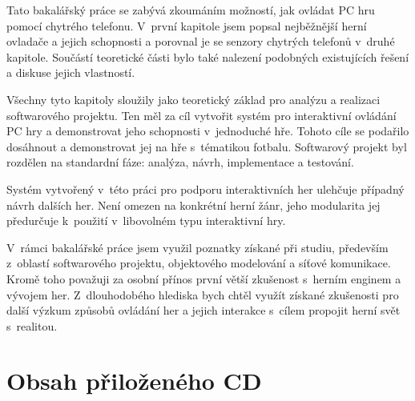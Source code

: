 \documentclass[thesis=B,czech,hidelinks]{FITthesis}[2012/06/26] %
\begin{document}
\begin{conclusion}
	
Tato bakalářský práce se zabývá zkoumáním možností, jak ovládat PC hru pomocí chytrého telefonu. V~první kapitole jsem popsal nejběžnější herní ovladače a jejich schopnosti a porovnal je se senzory chytrých telefonů v~druhé kapitole. Součástí teoretické části bylo také nalezení podobných existujících řešení a diskuse jejich vlastností.

Všechny tyto kapitoly sloužily jako teoretický základ pro analýzu a realizaci softwarového projektu. Ten měl za cíl vytvořit systém pro interaktivní ovládání PC hry a demonstrovat jeho schopnosti v~jednoduché hře. Tohoto cíle se podařilo dosáhnout a demonstrovat jej na hře s~tématikou fotbalu. Softwarový projekt byl rozdělen na standardní fáze: analýza, návrh, implementace a testování.

Systém vytvořený v~této práci pro podporu interaktivních her ulehčuje případný návrh dalších her. Není omezen na konkrétní herní žánr, jeho modularita jej předurčuje k~použití v~libovolném typu interaktivní hry. 

V~rámci bakalářské práce jsem využil poznatky získané při studiu, především z~oblastí softwarového projektu, objektového modelování a síťové komunikace. Kromě toho považuji za osobní přínos první větší zkušenost s~herním enginem a vývojem her. Z~dlouhodobého hlediska bych chtěl využít získané zkušenosti pro další výzkum způsobů ovládání her a jejich interakce s~cílem propojit herní svět s~realitou. 
	
\end{conclusion}




\appendix


\chapter{Obsah přiloženého CD}


\begin{figure}
\end{figure}
\end{document}
